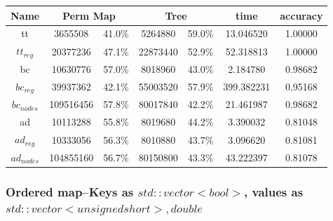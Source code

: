 \documentclass[]{article}
\theoremstyle{definition}
\begin{document}
\begin{center}
\begin{tabular} { |c|c|c|c|c|c|c| }
\hline
Name & \multicolumn{2}{c|}{Perm Map} & \multicolumn{2}{c|}{Tree} & time & accuracy \\
\hline

tt & 3655508 & 41.0\%  & 5264880 & 59.0\% & 13.046520 & 1.00000 \\

$tt_{reg}$ & 20377236 & 47.1\% & 22873440 & 52.9\% & 52.318813 & 1.00000 \\

bc & 10630776 & 57.0\% & 8018960 & 43.0\% & 2.184780 & 0.98682 \\

$bc_{reg}$ & 39937362 & 42.1\% & 55003520 & 57.9\% & 399.382231 & 0.95168 \\

$bc_{nodes}$ & 109516456 & 57.8\% & 80017840 & 42.2\% & 21.461987 & 0.98682 \\

ad & 10113288 & 55.8\% & 8019680 & 44.2\% & 3.390032 & 0.81048 \\

$ad_{reg}$ &10333056 & 56.3\% & 8010880 & 43.7\% & 3.096620 & 0.81081 \\

$ad_{nodes}$ & 104855160 & 56.7\% & 80150800 & 43.3\% & 43.222397 & 0.81078 \\
\hline
\end{tabular}
\end{center}

\subsubsection{Ordered map--Keys as $std::vector<bool>$, values as $std::vector<unsigned short>, double$}
\end{document}

